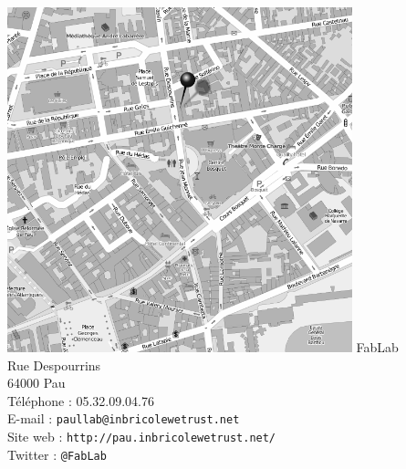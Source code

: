 \begin{center}
  \vfill
  \includegraphics[width=10cm]{carte.png}
  \vfill
  FabLab\\
  Rue Despourrins\\
  64000 Pau\\
  \vfill
  \medskip Téléphone : 05.32.09.04.76\\ %
  \medskip E-mail : \texttt{paullab@inbricolewetrust.net}\\%
  \medskip Site web : \texttt{http://pau.inbricolewetrust.net/}\\%
  \medskip Twitter : \texttt{@FabLab}
  \vfill
\end{center}
